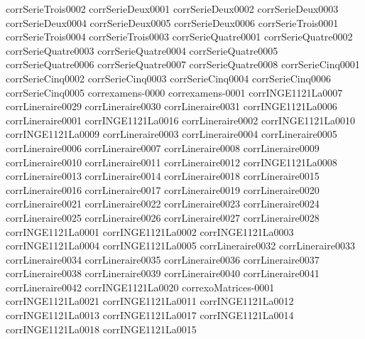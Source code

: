 {corrSerieTrois0002}
{corrSerieDeux0001}
{corrSerieDeux0002}
{corrSerieDeux0003}
{corrSerieDeux0004}
{corrSerieDeux0005}
{corrSerieDeux0006}
{corrSerieTrois0001}
{corrSerieTrois0004}
{corrSerieTrois0003}
{corrSerieQuatre0001}
{corrSerieQuatre0002}
{corrSerieQuatre0003}
{corrSerieQuatre0004}
{corrSerieQuatre0005}
{corrSerieQuatre0006}
{corrSerieQuatre0007}
{corrSerieQuatre0008}
{corrSerieCinq0001}
{corrSerieCinq0002}
{corrSerieCinq0003}
{corrSerieCinq0004}
{corrSerieCinq0006}
{corrSerieCinq0005}
{correxamens-0000}
{correxamens-0001}
{corrINGE1121La0007}
{corrLineraire0029}
{corrLineraire0030}
{corrLineraire0031}
{corrINGE1121La0006}
{corrLineraire0001}
{corrINGE1121La0016}
{corrLineraire0002}
{corrINGE1121La0010}
{corrINGE1121La0009}
{corrLineraire0003}
{corrLineraire0004}
{corrLineraire0005}
{corrLineraire0006}
{corrLineraire0007}
{corrLineraire0008}
{corrLineraire0009}
{corrLineraire0010}
{corrLineraire0011}
{corrLineraire0012}
{corrINGE1121La0008}
{corrLineraire0013}
{corrLineraire0014}
{corrLineraire0018}
{corrLineraire0015}
{corrLineraire0016}
{corrLineraire0017}
{corrLineraire0019}
{corrLineraire0020}
{corrLineraire0021}
{corrLineraire0022}
{corrLineraire0023}
{corrLineraire0024}
{corrLineraire0025}
{corrLineraire0026}
{corrLineraire0027}
{corrLineraire0028}
{corrINGE1121La0001}
{corrINGE1121La0002}
{corrINGE1121La0003}
{corrINGE1121La0004}
{corrINGE1121La0005}
{corrLineraire0032}
{corrLineraire0033}
{corrLineraire0034}
{corrLineraire0035}
{corrLineraire0036}
{corrLineraire0037}
{corrLineraire0038}
{corrLineraire0039}
{corrLineraire0040}
{corrLineraire0041}
{corrLineraire0042}
{corrINGE1121La0020}
{correxoMatrices-0001}
{corrINGE1121La0021}
{corrINGE1121La0011}
{corrINGE1121La0012}
{corrINGE1121La0013}
{corrINGE1121La0017}
{corrINGE1121La0014}
{corrINGE1121La0018}
{corrINGE1121La0015}
